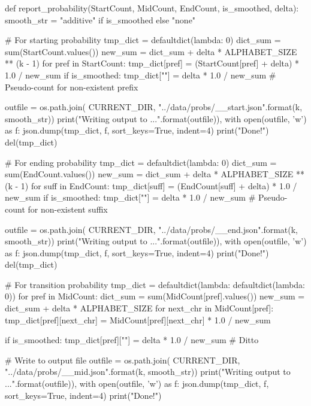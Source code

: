 \documentclass{article} %
\theoremstyle{definition}
\theoremstyle{theorem}
\theoremstyle{remark}
\theoremstyle{remark}
\begin{document}
\begin{python}
def report_probability(StartCount, MidCount, EndCount, is_smoothed, delta):
    smooth_str = "additive" if is_smoothed else "none"

    # For starting probability
    tmp_dict = defaultdict(lambda: 0)
    dict_sum = sum(StartCount.values())
    new_sum = dict_sum + delta * ALPHABET_SIZE ** (k - 1)
    for pref in StartCount:
        tmp_dict[pref] = (StartCount[pref] + delta) * 1.0 / new_sum
    if is_smoothed:
        tmp_dict[""] = delta * 1.0 / new_sum # Pseudo-count for non-existent prefix

    outfile = os.path.join(
        CURRENT_DIR, "../data/probs/{}_{}_start.json".format(k, smooth_str))
    print("Writing output to {}...".format(outfile)),
    with open(outfile, 'w') as f:
        json.dump(tmp_dict, f, sort_keys=True, indent=4)
    print("Done!")
    del(tmp_dict)

    # For ending probability
    tmp_dict = defaultdict(lambda: 0)
    dict_sum = sum(EndCount.values())
    new_sum = dict_sum + delta * ALPHABET_SIZE ** (k - 1)
    for suff in EndCount:
        tmp_dict[suff] = (EndCount[suff] + delta) * 1.0 / new_sum
    if is_smoothed:
        tmp_dict[""] = delta * 1.0 / new_sum # Pseudo-count for non-existent suffix

    outfile = os.path.join(
        CURRENT_DIR, "../data/probs/{}_{}_end.json".format(k, smooth_str))
    print("Writing output to {}...".format(outfile)),
    with open(outfile, 'w') as f:
        json.dump(tmp_dict, f, sort_keys=True, indent=4)
    print("Done!")
    del(tmp_dict)

    # For transition probability
    tmp_dict = defaultdict(lambda: defaultdict(lambda: 0))
    for pref in MidCount:
        dict_sum = sum(MidCount[pref].values())
        new_sum = dict_sum + delta * ALPHABET_SIZE
        for next_chr in MidCount[pref]:
            tmp_dict[pref][next_chr] = MidCount[pref][next_chr] * 1.0 / new_sum

        if is_smoothed:
            tmp_dict[pref][""] = delta * 1.0 / new_sum  # Ditto

    # Write to output file
    outfile = os.path.join(
        CURRENT_DIR, "../data/probs/{}_{}_mid.json".format(k, smooth_str))
    print("Writing output to {}...".format(outfile)),
    with open(outfile, 'w') as f:
        json.dump(tmp_dict, f, sort_keys=True, indent=4)
    print("Done!")
\end{python}

\vspace{\fill}
\pagebreak
\end{document}
